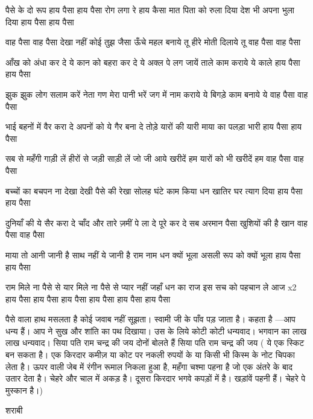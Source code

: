 पैसे के दो रूप
हाय पैसा हाय पैसा
रोग लगा रे हाय कैसा
मात पिता को रुला दिया
देश भी अपना भुला दिया
हाय पैसा हाय पैसा

वाह पैसा वाह पैसा
देखा नहीं कोई तुझ जैसा
ऊँचे महल बनाये तू
हीरे मोती दिलाये तू
वाह पैसा वाह पैसा

आँख को अंधा कर दे ये
कान को बहरा कर दे ये
अक्ल पे लग जायें ताले
काम कराये ये काले
हाय पैसा हाय पैसा

झुक झुक लोग सलाम करें
नेता गण मेरा पानी भरें
जग में नाम कराये ये
बिगड़े काम बनाये ये
वाह पैसा वाह पैसा


भाई बहनों में वैर करा दे
अपनों को ये गैर बना दे
तोड़े यारों की यारी
माया का पलड़ा भारी
हाय पैसा हाय पैसा






सब से महँगी गाड़ी लें
हीरों से जड़ी साड़ी लें
जो जी आये खरीदें हम
यारों को भी खरीदें हम
वाह पैसा वाह पैसा






बच्चों का बचपन ना देखा
देखी पैसे की रेखा
सोलह घंटे काम किया
धन खातिर घर त्याग दिया
हाय पैसा हाय पैसा






दुनियाँ की ये सैर करा दे
चाँद और तारे ज़मीं पे ला दे
पूरे कर दे सब अरमान
पैसा खुशियों की है खान
वाह पैसा वाह पैसा






माया तो आनी जानी है
साथ नहीं ये जानी है
राम नाम धन क्यों भूला
असली रूप को क्यों भूला
हाय पैसा हाय पैसा






राम मिले ना पैसे से
यार मिले ना पैसे से
प्यार नहीं जहाँ धन का राज
इस सच को पहचान ले आज x2
हाय पैसा हाय पैसा
हाय पैसा हाय पैसा
हाय पैसा हाय पैसा

पैसे वाला हाथ मसलता है
कोई जवाब नहीं सूझता।
स्वामी जी के पाँव पड़ जाता है।
कहता है —आप धन्य हैं। आप ने सुख और
शांति का पथ दिखाया। उस के लिये कोटी
कोटी धन्यवाद। भगवान का लाख लाख
धन्यवाद।
सिया पति राम चन्द्र की जय
दोनों बोलते हैं
सिया पति राम चन्द्र की जय
( ये एक स्किट बन सकता है।
एक किरदार कमीज़ या कोट पर नकली
रुपयों के या किसी भी किस्म के नोट चिपका
लेता है। ऊपर वाली जेब में रंगीन रूमाल
निकला हुआ है, महँगा चश्मा पहना है जो
एक अंतरे के बाद उतार देता है। चेहरे और
चाल में अकड़ है।
दूसरा किरदार भगवे कपड़ों में है। खड़ांवें
पहनी हैं। चेहरे पे मुस्कान है।)



शराबी

